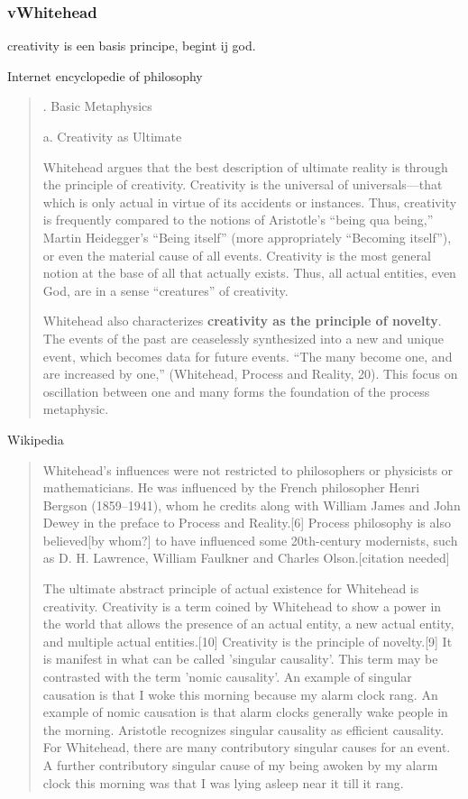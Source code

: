 \documentclass[a4paper]{Thesis}
\begin{document}
	\subsubsection{vWhitehead}
	creativity is een basis principe, begint ij god.
	
	Internet encyclopedie of philosophy
	\begin{quotation}
		. Basic Metaphysics
		
		a. Creativity as Ultimate
		
		Whitehead argues that the best description of ultimate reality is through the principle of creativity. Creativity is the universal of universals—that which is only actual in virtue of its accidents or instances. Thus, creativity is frequently compared to the notions of Aristotle’s “being qua being,” Martin Heidegger’s “Being itself” (more appropriately “Becoming itself”), or even the material cause of all events. Creativity is the most general notion at the base of all that actually exists. Thus, all actual entities, even God, are in a sense “creatures” of creativity.
		
		Whitehead also characterizes \textbf{creativity as the principle of novelty}. The events of the past are ceaselessly synthesized into a new and unique event, which becomes data for future events. “The many become one, and are increased by one,” (Whitehead, Process and Reality, 20). This focus on oscillation between one and many forms the foundation of the process metaphysic.
	\end{quotation}
	
	Wikipedia
	\begin{quotation}
		Whitehead's influences were not restricted to philosophers or physicists or mathematicians. He was influenced by the French philosopher Henri Bergson (1859–1941), whom he credits along with William James and John Dewey in the preface to Process and Reality.[6] Process philosophy is also believed[by whom?] to have influenced some 20th-century modernists, such as D. H. Lawrence, William Faulkner and Charles Olson.[citation needed]
		
		The ultimate abstract principle of actual existence for Whitehead is creativity. Creativity is a term coined by Whitehead to show a power in the world that allows the presence of an actual entity, a new actual entity, and multiple actual entities.[10] Creativity is the principle of novelty.[9] It is manifest in what can be called 'singular causality'. This term may be contrasted with the term 'nomic causality'. An example of singular causation is that I woke this morning because my alarm clock rang. An example of nomic causation is that alarm clocks generally wake people in the morning. Aristotle recognizes singular causality as efficient causality. For Whitehead, there are many contributory singular causes for an event. A further contributory singular cause of my being awoken by my alarm clock this morning was that I was lying asleep near it till it rang.
	\end{quotation}
	
\end{document}
